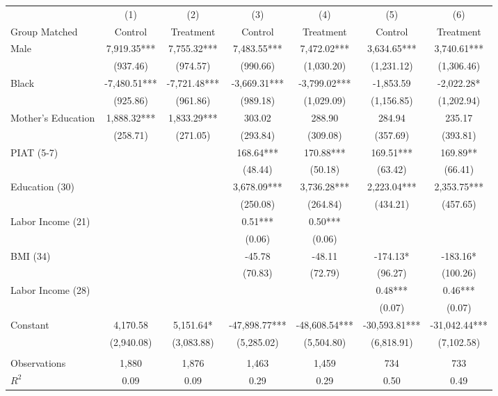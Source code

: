 \begin{tabular}{lcccccc} \toprule
 & (1) & (2) & (3) & (4) & (5) & (6) \\ 
Group Matched & Control & Treatment & Control & Treatment & Control & Treatment \\ \midrule
Male & 7,919.35*** & 7,755.32*** & 7,483.55*** & 7,472.02*** & 3,634.65*** & 3,740.61*** \\
 & (937.46) & (974.57) & (990.66) & (1,030.20) & (1,231.12) & (1,306.46) \\
Black  & -7,480.51*** & -7,721.48*** & -3,669.31*** & -3,799.02*** & -1,853.59 & -2,022.28* \\
 & (925.86) & (961.86) & (989.18) & (1,029.09) & (1,156.85) & (1,202.94) \\
Mother's Education & 1,888.32*** & 1,833.29*** & 303.02 & 288.90 & 284.94 & 235.17 \\
 & (258.71) & (271.05) & (293.84) & (309.08) & (357.69) & (393.81) \\
PIAT (5-7) &  &  & 168.64*** & 170.88*** & 169.51*** & 169.89** \\
 &  &  & (48.44) & (50.18) & (63.42) & (66.41) \\
Education (30)  &  &  & 3,678.09*** & 3,736.28*** & 2,223.04*** & 2,353.75*** \\
 &  &  & (250.08) & (264.84) & (434.21) & (457.65) \\
Labor Income (21) &  &  & 0.51*** & 0.50*** &  &  \\
 &  &  & (0.06) & (0.06) &  &  \\
BMI (34) &  &  & -45.78 & -48.11 & -174.13* & -183.16* \\
 &  &  & (70.83) & (72.79) & (96.27) & (100.26) \\
Labor Income (28) &  &  &  &  & 0.48*** & 0.46*** \\
 &  &  &  &  & (0.07) & (0.07) \\
Constant & 4,170.58 & 5,151.64* & -47,898.77*** & -48,608.54*** & -30,593.81*** & -31,042.44*** \\
 & (2,940.08) & (3,083.88) & (5,285.02) & (5,504.80) & (6,818.91) & (7,102.58) \\ \\ \midrule
 Observations & 1,880 & 1,876 & 1,463 & 1,459 & 734 & 733 \\ 
$R^2$ & 0.09 & 0.09 & 0.29 & 0.29 & 0.50 & 0.49 \\ \bottomrule
\end{tabular}
